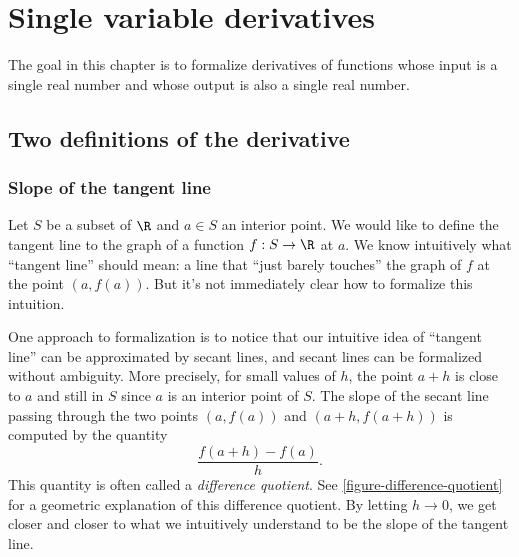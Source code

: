 \chapter{Single variable derivatives} \label{single-var}

The goal in this chapter is to formalize derivatives of functions whose input is a single real number and whose output is also a single real number. 

\section{Two definitions of the derivative}

\subsection{Slope of the tangent line}

Let $S$ be a subset of $\R$ and $a \in S$ an interior point. We would like to define the tangent line to the graph of a function $f : S \to \R$ at $a$. We know intuitively what ``tangent line'' should mean: a line that ``just barely touches'' the graph of $f$ at the point $(a, f(a))$. But it's not immediately clear how to formalize this intuition.  

One approach to formalization is to notice that our intuitive idea of ``tangent line'' can be approximated by secant lines, and secant lines can be formalized without ambiguity. More precisely, for small values of $h$, the point $a+h$ is close to $a$ and still in $S$ since $a$ is an interior point of $S$. The slope of the secant line passing through the two points $(a, f(a))$ and $(a+h, f(a+h))$ is computed by the quantity
\[ \frac{f(a+h)-f(a)}{h}. \]
This quantity is often called a \emph{difference quotient}. See \cref{figure-difference-quotient} for a geometric explanation of this difference quotient. By letting $h \to 0$, we get closer and closer to what we intuitively understand to be the slope of the tangent line. 

